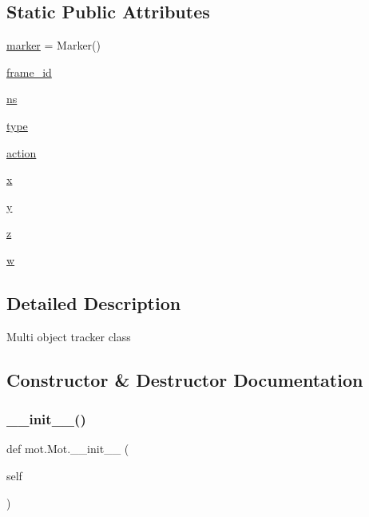 \subsection*{Static Public Attributes}
\begin{DoxyCompactItemize}
\item 
\hyperlink{classmot_1_1Mot_afa88ed1870c8848b4368fe59d12c9f7f}{marker} = Marker()
\item 
\hyperlink{classmot_1_1Mot_adddddf34ffd1d5e93a4ab67a79416531}{frame\+\_\+id}
\item 
\hyperlink{classmot_1_1Mot_a0918530a3a23816411d3e02de7b58b05}{ns}
\item 
\hyperlink{classmot_1_1Mot_a1c8fd1b60dab0f8df2dff9e9b66996db}{type}
\item 
\hyperlink{classmot_1_1Mot_a9e252c1dac6a069e958f24ec5d2ece06}{action}
\item 
\hyperlink{classmot_1_1Mot_a58647c038e9ef54cc10eb37be08d340c}{x}
\item 
\hyperlink{classmot_1_1Mot_a80b2443ae75a50bf00d568decfaf3068}{y}
\item 
\hyperlink{classmot_1_1Mot_a5c825a78182ddd5d999a5f873cc54191}{z}
\item 
\hyperlink{classmot_1_1Mot_a792c086f8f01b7974e53dda4d88dd27d}{w}
\end{DoxyCompactItemize}


\subsection{Detailed Description}
\begin{DoxyVerb}Multi object tracker class\end{DoxyVerb}
 

\subsection{Constructor \& Destructor Documentation}
\mbox{\label{classmot_1_1Mot_a63d1ea755e2c380d5d8830862874b56a}} 
\subsubsection{\texorpdfstring{\+\_\+\+\_\+init\+\_\+\+\_\+()}{\_\_init\_\_()}}
{\footnotesize\ttfamily def mot.\+Mot.\+\_\+\+\_\+init\+\_\+\+\_\+ (\begin{DoxyParamCaption}\item[{}]{self }\end{DoxyParamCaption})}



